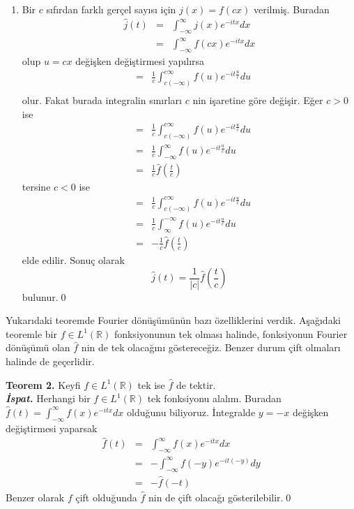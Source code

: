 \documentclass[a4paper, 9pt]{article}
\begin{document}
\begin{enumerate}
	\item Bir $c$ sıfırdan farklı gerçel sayısı için $j(x)=f(cx)$ verilmiş. Buradan
		\begin{eqnarray*}
		\widehat{j}(t)  &=&  \int_{-\infty }^{\infty } j(x) e^{-itx}dx  \\ 
		&=&  \int_{-\infty }^{\infty } f(cx) e^{-itx}dx
		\end{eqnarray*}
		olup $u=cx$ değişken değiştirmesi yapılırsa
		\begin{eqnarray*}
		&=& \frac{1}{c} \int_{c (-\infty) }^{c \infty } f(u)e^{-it\frac{u}{c}} du \\   
		\end{eqnarray*}
		olur. Fakat burada integralin sınırları $c$ nin işaretine göre değişir. Eğer $c>0$ ise
		\begin{eqnarray*}
		&=& \frac{1}{c} \int_{c (-\infty) }^{c \infty } f(u)e^{-it\frac{u}{c}} du \\   
		&=& \frac{1}{c} \int_{-\infty }^{\infty } f(u)e^{-it\frac{u}{c}} du \\  
		&=& \frac{1}{c} \widehat{f}(\frac{t}{c}) 
		\end{eqnarray*}
		tersine $c<0$ ise
		\begin{eqnarray*}
		&=& \frac{1}{c} \int_{c (-\infty) }^{c \infty } f(u)e^{-it\frac{u}{c}} du \\   
		&=& \frac{1}{c} \int_{\infty }^{-\infty } f(u)e^{-it\frac{u}{c}} du \\  
		&=& -\frac{1}{c} \widehat{f}(\frac{t}{c}) 
		\end{eqnarray*}
		elde edilir. Sonuç olarak
		$$ \widehat{j}(t) = \frac{1}{\left | c \right |} \widehat{f}(\frac{t}{c}) $$
		bulunur.\qed
\end{enumerate}

Yukarıdaki teoremde Fourier dönüşümünün bazı özelliklerini verdik. Aşağıdaki teoremle bir $f\in L^1(\mathbb{R})$ fonksiyonunun tek olması halinde, fonksiyonun Fourier dönüşümü olan $\widehat{f}$ nin de tek olacağını göstereceğiz. Benzer durum çift olmaları halinde de geçerlidir.

\textbf{Teorem 2.} Keyfi $f \in L^1(\mathbb{R})$ tek ise  $\widehat{f}$ de tektir.\\
\textit{\textbf{İspat.}} 
Herhangi bir $f \in L^1(\mathbb{R})$ tek fonksiyonu alalım. Buradan	$\widehat{f}(t) =  \int_{-\infty }^{\infty } f(x) e^{-itx}dx$ olduğunu biliyoruz. İntegralde $y=-x$ değişken değiştirmesi yaparsak  
	\begin{eqnarray*} 
		\widehat{f}(t) &=&  \int_{-\infty }^{\infty } f(x) e^{-itx}dx\\
		&=& - \int_{-\infty }^{ \infty } f(-y)e^{-it(-y)} dy \\   
		&=& -\widehat{f}(-t) 
	\end{eqnarray*}
Benzer olarak $f$ çift olduğunda $\widehat{f}$ nin de çift olacağı gösterilebilir.\qed
\end{document}
